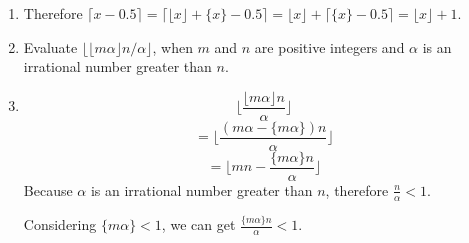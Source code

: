 \documentclass[12pt,a4paper]{article}
\makeatletter
\newtheorem*{solution}{Solution}
\theoremstyle{definition}
\renewenvironment{solution}[1][Solution] {\par\pushQED{\qed}\normalfont\topsep6\p@\@plus6\p@\relax\trivlist\item[\hskip\labelsep\bfseries#1\@addpunct{.}]\ignorespaces}{\popQED\endtrivlist\@endpefalse} \makeatother
\makeatother
\begin{document}
\begin{enumerate}
\begin{solution}
\begin{enumerate}
\begin{itemize}
        	        	    Therefore $\lceil x-0.5 \rceil=\lceil \lfloor x \rfloor +\{x\}-0.5 \rceil=\lfloor x\rfloor+\lceil \{x\}-0.5\rceil=\lfloor x\rfloor+1$.
        	        \end{itemize}
        	\end{enumerate}
        \end{solution}
    \item 
        Evaluate $\lfloor\lfloor m\alpha\rfloor n/\alpha \rfloor$, when $m$ and $n$ are positive integers and $\alpha$ is an irrational number greater than $n$.
        \begin{solution}
        	\begin{equation*}
        	    \lfloor \frac{\lfloor m\alpha \rfloor n}{\alpha} \rfloor
        	\end{equation*}
        	\begin{equation*}
        	    =\lfloor \frac{(m\alpha-\{m \alpha \})n}{\alpha} \rfloor
        	\end{equation*}
        	\begin{equation*}
        	    =\lfloor mn-\frac{\{m\alpha \}n}{\alpha} \rfloor
        	\end{equation*}
        	Because $\alpha$ is an irrational number greater than $n$, therefore $\frac{n}{\alpha}<1$.
        	
        	Considering $\{m\alpha \}<1$, we can get $\frac{\{m\alpha\}n}{\alpha}<1$.
        	

\end{solution}
\end{enumerate}
\end{document}

